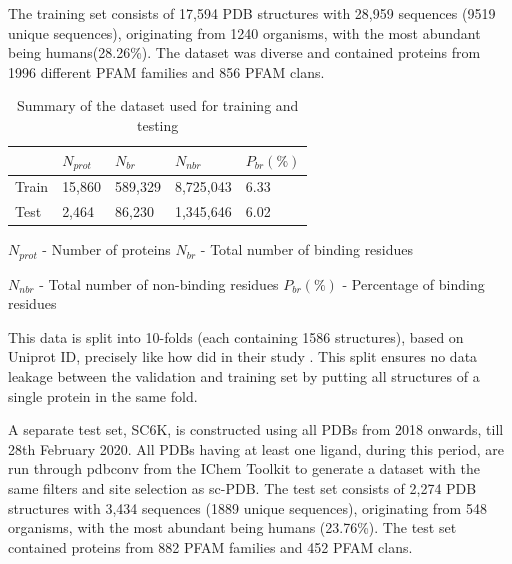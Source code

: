 \documentclass[journal=jcisd8,manuscript=article]{achemso}
\begin{document}
The training set consists of 17,594 PDB structures with 28,959 sequences (9519 unique sequences), originating from 1240 organisms, with the most abundant being humans(28.26\%). The dataset was diverse and contained proteins from 1996 different PFAM families and 856 PFAM clans.

\begin{table}
    \centering
    \begin{tabular}{| P{2.75cm} | P{2.75cm} | P{2.75cm} | P{2.75cm} | P{2.75cm} |}
        \hline
              & $N_{prot}$ & $N_{br}$ & $N_{nbr}$ & $P_{br}(\%)$ \\
        \hline
        Train & 15,860     & 589,329  & 8,725,043 & 6.33         \\
        Test  & 2,464      & 86,230   & 1,345,646 & 6.02         \\
        \hline
    \end{tabular}
    \caption{\label{tab:dataset_summary} Summary of the dataset used for training and testing}
    \vspace{5 mm}
    \noindent $N_{prot}$ - Number of proteins \hfill $N_{br}$ - Total number of binding residues

    \vspace{3 mm}

    \noindent $N_{nbr}$ - Total number of non-binding residues \hfill $P_{br}(\%)$ - Percentage of binding residues
\end{table}

This data is split into 10-folds (each containing 1586 structures), based on Uniprot ID, precisely like how \citeauthor{stepniewska2020improving} did in their study \cite{stepniewska2020improving}. This split ensures no data leakage between the validation and training set by putting all structures of a single protein in the same fold.

A separate test set, SC6K, is constructed using all PDBs from 2018 onwards, till 28th February 2020. All PDBs having at least one ligand, during this period, are run through pdbconv from the IChem Toolkit \cite{da2018ichem} to generate a dataset with the same filters and site selection as sc-PDB\cite{desaphy2015sc}. The test set consists of 2,274 PDB structures with 3,434 sequences (1889 unique sequences), originating from 548 organisms, with the most abundant being humans (23.76\%). The test set contained proteins from 882 PFAM families and 452 PFAM clans.
\end{document}
